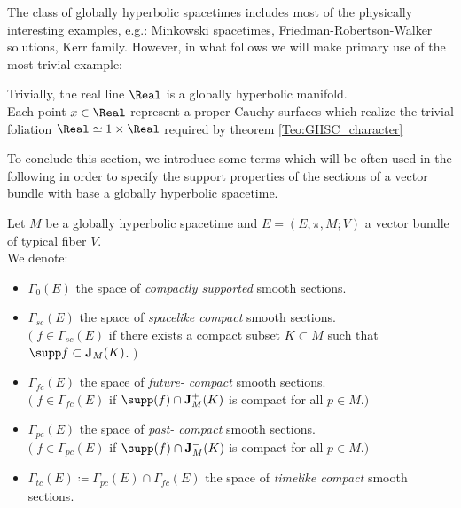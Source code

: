 \documentclass[Main]{subfiles}
\begin{document}
			The class of globally hyperbolic spacetimes includes most of the physically interesting examples, e.g.: Minkowski spacetimes, Friedman-Robertson-Walker solutions, Kerr family. 
			However, in what follows we will make primary use of the most trivial example:
			\begin{example}
				Trivially, the real line $\Real$ is a globally hyperbolic manifold.
				\\
				Each point $x\in \Real$ represent a proper Cauchy surfaces which realize the trivial foliation $\Real \simeq 1\times \Real $ required by theorem \ref{Teo:GHSC_character}
			\end{example}

			To conclude this section, we introduce some terms which will be often used in the following in order to
specify the support properties of the sections of a vector bundle with base a globally hyperbolic spacetime.
			\begin{notationfix}
				Let $M$ be a globally hyperbolic spacetime and $E=(E,\pi,M;V)$ a vector bundle of typical fiber $V$.\\
				We denote:
				\begin{itemize}
					\item $\Gamma_0(E)$ the space of \emph{compactly supported} smooth sections.
					\item $\Gamma_{sc}(E)$  the space of \emph{spacelike compact} smooth sections.\\
						$\big(\; f\in \Gamma_{sc}(E)$ if there exists a compact subset $K \subset M$  such that $\supp f \subset \mathbf{J}_M(K)$. $\big)$
					\item  $\Gamma_{fc}(E) $ the space of \emph{future- compact} smooth sections.\\
						$\big(\; f\in \Gamma_{fc}(E) $ if  $\supp(f) \cap  \mathbf{J}^+_M(K)$ is compact for all $p\in M$.$\big)$
					\item  $\Gamma_{pc}(E) $ the space of \emph{past- compact} smooth sections.\\
						$\big(\; f\in \Gamma_{pc}(E) $ if  $\supp(f) \cap  \mathbf{J}^-_M(K)$ is compact for all $p\in M$.$\big)$
					\item $\Gamma_{tc}(E) \coloneqq \Gamma_{pc}(E) \cap \Gamma_{fc}(E) $ the space of \emph{timelike compact} smooth sections.
				\end{itemize}
			\end{notationfix}				
			

		

\end{document}
